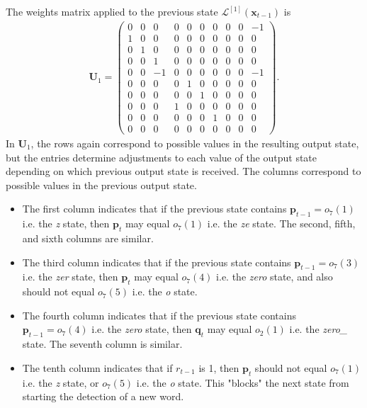 \documentclass{somasmsc}
\begin{document}
The weights matrix applied to the previous state $\mathcal{L}^{\left[1\right]}\left(\pmb{x}_{t-1}\right)$ is
\begin{align}
\mathbf{U}_1 =
\begin{pmatrix}
0 & 0 &  0 & 0 & 0 & 0 & 0 & 0 & 0 & -1\\
1 & 0 &  0 & 0 & 0 & 0 & 0 & 0 & 0 &  0\\
0 & 1 &  0 & 0 & 0 & 0 & 0 & 0 & 0 &  0\\
0 & 0 &  1 & 0 & 0 & 0 & 0 & 0 & 0 &  0\\
0 & 0 & -1 & 0 & 0 & 0 & 0 & 0 & 0 & -1\\
0 & 0 &  0 & 0 & 1 & 0 & 0 & 0 & 0 &  0\\
0 & 0 &  0 & 0 & 0 & 1 & 0 & 0 & 0 &  0\\
0 & 0 &  0 & 1 & 0 & 0 & 0 & 0 & 0 &  0\\
0 & 0 &  0 & 0 & 0 & 0 & 1 & 0 & 0 &  0\\
0 & 0 &  0 & 0 & 0 & 0 & 0 & 0 & 0 &  0
\end{pmatrix}.
\end{align}
In $\mathbf{U}_1$, the rows again correspond to possible values in the resulting output state, but the entries determine adjustments to each value of the output state depending on which previous output state is received. The columns correspond to possible values in the previous output state.
\begin{itemize}
    \item The first column indicates that if the previous state contains $\pmb{p}_{t-1} = o_7(1)$ i.e. the \textit{z} state, then $\pmb{p}_t$ may equal $o_7(1)$ i.e. the \textit{ze} state. The second, fifth, and sixth columns are similar.
    \item The third column indicates that if the previous state contains $\pmb{p}_{t-1} = o_7(3)$ i.e. the \textit{zer} state, then $\pmb{p}_t$ may equal $o_7(4)$  i.e. the \textit{zero} state, and also should not equal $o_7(5)$ i.e. the \textit{o} state.
    \item The fourth column indicates that if the previous state contains $\pmb{p}_{t-1} = o_7(4)$ i.e. the \textit{zero} state, then $\pmb{q}_t$ may equal $o_2(1)$ i.e. the \textit{zero\_} state. The seventh column is similar.
    \item The tenth column indicates that if $r_{t-1}$ is 1, then $\pmb{p}_t$ should not equal $o_7(1)$ i.e. the \textit{z} state, or $o_7(5)$ i.e. the \textit{o} state. This "blocks" the next state from starting the detection of a new word.
\end{itemize}
\end{document}
